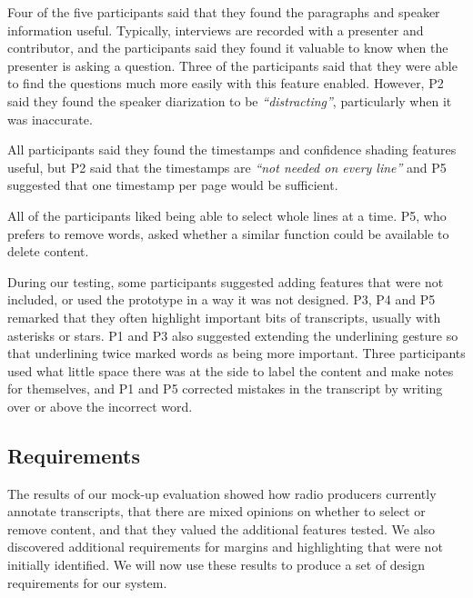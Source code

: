 Four of the five participants said that they found the paragraphs and speaker information useful. Typically, interviews
are recorded with a presenter and contributor, and the participants said they found it valuable to know when the
presenter is asking a question. Three of the participants said that they were able to find the questions much more
easily with this feature enabled. However, P2 said they found the speaker diarization to be \textit{``distracting''},
particularly when it was inaccurate.

All participants said they found the timestamps and confidence shading features useful, but P2 said that the timestamps
are \textit{``not needed on every line''} and P5 suggested that one timestamp per page would be sufficient.

All of the participants liked being able to select whole lines at a time. P5, who prefers to remove words, asked
whether a similar function could be available to delete content.

During our testing, some participants suggested adding features that were not included, or used the prototype in a way
it was not designed.  P3, P4 and P5 remarked that they often highlight important bits of transcripts, usually with
asterisks or stars.  P1 and P3 also suggested extending the underlining gesture so that underlining twice marked words as
being more important.  Three participants used what little space there was at the side to label the content and make
notes for themselves, and P1 and P5 corrected mistakes in the transcript by writing over or above the incorrect word.

































\subsection{Requirements}

The results of our mock-up evaluation showed how radio producers currently annotate transcripts, that there are mixed
opinions on whether to select or remove content, and that they valued the additional features tested.  We also
discovered additional requirements for margins and highlighting that were not initially identified.  We will now use
these results to produce a set of design requirements for our system.

